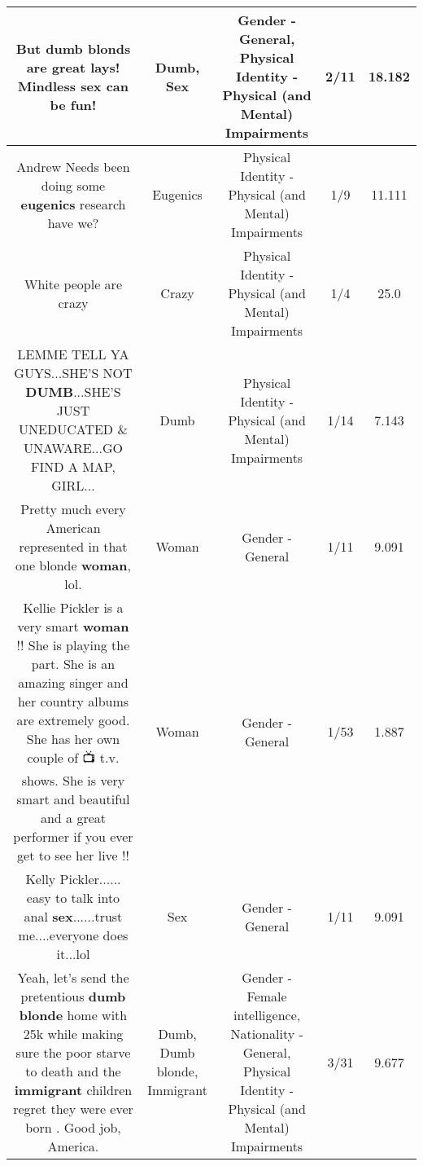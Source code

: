 \documentclass[11pt]{article}
\newlength\mylength
\begin{document}
\begin{center}
\begin{longtable}{|C{.65\mylength}|C{.30\mylength}|C{.12\mylength}|C{.12\mylength}|C{.12\mylength}|}
  \small But \textbf{dumb} blonds are great lays! Mindless \textbf{sex} can be fun!\normalsize   & Dumb, Sex & Gender - General, Physical Identity - Physical (and Mental) Impairments & 2/11 & 18.182 \\  \hline
  \small Andrew Needs been doing some \textbf{eugenics} research have we?\normalsize   & Eugenics & Physical Identity - Physical (and Mental) Impairments & 1/9 & 11.111 \\  \hline
  \small White people are crazy\normalsize   & Crazy & Physical Identity - Physical (and Mental) Impairments & 1/4 & 25.0 \\  \hline
  \small LEMME TELL YA GUYS...SHE'S NOT \textbf{DUMB}...SHE'S JUST UNEDUCATED \& UNAWARE...GO FIND A MAP, GIRL...\normalsize   & Dumb & Physical Identity - Physical (and Mental) Impairments & 1/14 & 7.143 \\  \hline
  \small Pretty much every American represented in that one blonde \textbf{woman}, lol.\normalsize   & Woman & Gender - General & 1/11 & 9.091 \\  \hline
  \small Kellie Pickler is a very smart \textbf{woman} !!  She is playing the part.    She is an amazing singer and her country albums are extremely good. She has her own couple of 📺 t.v. shows.   She is very smart and beautiful and a great performer if you ever get to see her live !!\normalsize   & Woman & Gender - General & 1/53 & 1.887 \\  \hline
  \small Kelly Pickler...... easy to talk into anal \textbf{sex}......trust me....everyone does it...lol\normalsize   & Sex & Gender - General & 1/11 & 9.091 \\  \hline
  \small Yeah, let's send the pretentious \textbf{d\textbf{umb} blonde} home with 25k while making sure the poor starve to death and the \textbf{immigrant} children regret they were ever born . Good job, America.\normalsize   & Dumb, Dumb blonde, Immigrant & Gender - Female intelligence, Nationality - General, Physical Identity - Physical (and Mental) Impairments & 3/31 & 9.677 \\  \hline

\end{longtable}
\end{center}
\end{document}
